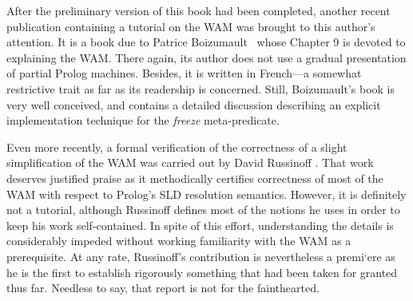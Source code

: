 After the preliminary version of this book had been completed, another recent
publication containing a tutorial on the WAM was brought to this author’s attention.
It is a book due to Patrice Boizumault \cite{Boi88}\ whose Chapter 9 is devoted
to explaining the WAM. There again, its author does not use a gradual presentation
of partial Prolog machines. Besides, it is written in French—a somewhat restrictive
trait as far as its readership is concerned. Still, Boizumault’s book is very well
conceived, and contains a detailed discussion describing an explicit implementation
technique for the \emph{freeze} meta-predicate.

Even more recently, a formal verification of the correctness of a slight simplification
of the WAM was carried out by David Russinoff \cite{Rus89}. That work deserves
justified praise as it methodically certifies correctness of most of the WAM with
respect to Prolog’s SLD resolution semantics. However, it is definitely not a tutorial,
although Russinoff defines most of the notions he uses in order to keep his
work self-contained. In spite of this effort, understanding the details is considerably
impeded without working familiarity with the WAM as a prerequisite. At
any rate, Russinoff’s contribution is nevertheless a premi`ere as he is the first to
establish rigorously something that had been taken for granted thus far. Needless
to say, that report is not for the fainthearted.


\secup
